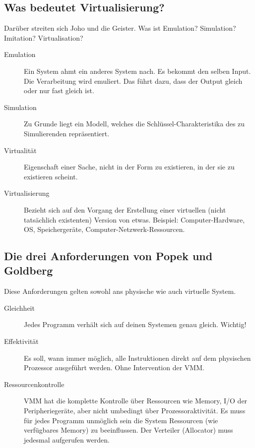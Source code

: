 \subsection{Was bedeutet Virtualisierung?}
\label{sec:was-bedeutet-virtualisierung}
Darüber streiten sich Joho und die Geister. Was ist Emulation? Simulation? Imitation?  Virtualisation?
\begin{description}
	\item[Emulation] Ein System ahmt ein anderes System nach. Es bekommt den selben Input. Die Verarbeitung wird emuliert. Das führt dazu, dass der Output gleich oder nur fast gleich ist.
	\item[Simulation] Zu Grunde liegt ein Modell, welches die Schlüssel-Charakteristika des zu Simulierenden repräsentiert.
	\item[Virtualität] Eigenschaft einer Sache, nicht in der Form zu existieren, in der sie zu existieren scheint.
	\item[Virtualisierung] Bezieht sich auf den Vorgang der Erstellung einer virtuellen (nicht tatsächlich existenten) Version von etwas. Beispiel: Computer-Hardware, OS, Speichergeräte, Computer-Netzwerk-Ressourcen. 
\end{description}

\subsection{Die drei Anforderungen von Popek und Goldberg}
\label{sec:popek-goldberg-anforderungen}
Diese Anforderungen gelten sowohl ans physische wie auch virtuelle System.
\begin{description}
	\item[Gleichheit] Jedes Programm verhält sich auf deinen Systemen genau gleich. Wichtig!
	\item[Effektivität] Es soll, wann immer möglich, alle Instruktionen direkt auf dem physischen Prozessor ausgeführt werden. Ohne Intervention der VMM.
	\item[Ressourcenkontrolle] VMM hat die komplette Kontrolle über Ressourcen wie Memory, I/O der Peripheriegeräte, aber nicht umbedingt über Prozessoraktivität. Es muss für jedes Programm unmöglich sein die System Ressourcen (wie verfügbares Memory) zu beeinflussen. Der Verteiler (Allocator) muss jedesmal aufgerufen werden.
\end{description}

